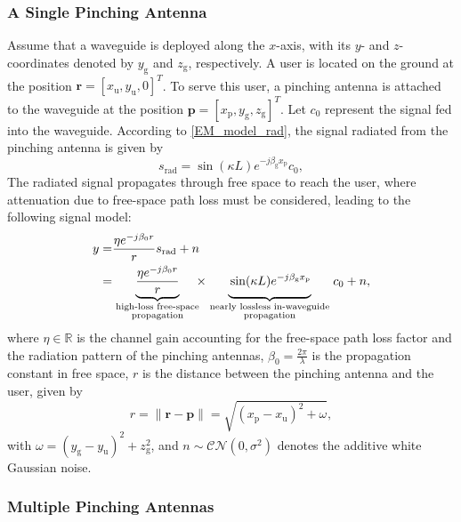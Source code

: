 \subsubsection{A Single Pinching Antenna}
Assume that a waveguide is deployed along the $x$-axis, with its $y$- and $z$-coordinates denoted by $y_{\mathrm{g}}$ and $z_{\mathrm{g}}$, respectively. A user is located on the ground at the position $\mathbf{r} = [x_{\mathrm{u}}, y_{\mathrm{u}}, 0]^T$. To serve this user, a pinching antenna is attached to the waveguide at the position $\mathbf{p} = [x_{\mathrm{p}}, y_{\mathrm{g}}, z_{\mathrm{g}}]^T$. Let $c_0$ represent the signal fed into the waveguide. According to \eqref{EM_model_rad}, the signal radiated from the pinching antenna is given by
\begin{equation}
s_{\mathrm{rad}} = \sin(\kappa L) e^{-j \beta_{\mathrm{g}} x_{\mathrm{p}}} c_0,
\end{equation}
The radiated signal propagates through free space to reach the user, where attenuation due to free-space path loss must be considered, leading to the following signal model:
\begin{align}
y = & \frac{\eta e^{-j \beta_0 r}}{r} s_{\mathrm{rad}} + n \nonumber \\
= & \underbrace{\frac{\eta e^{-j \beta_0 r}}{r}}_{\scriptstyle \text{high-loss free-space} \atop \scriptstyle \text{propagation}} \!\!\! \times \underbrace{ \vphantom{\frac{\eta e^{-j \beta_0 r}}{r}} \sin(\kappa L) e^{-j \beta_{\mathrm{g}} x_{\mathrm{p}}}}_{\scriptstyle \text{nearly lossless in-waveguide} \atop \scriptstyle  \text{propagation}}  c_0 + n,
\end{align}
where $\eta \in \mathbb{R}$ is the channel gain accounting for the free-space path loss factor and the radiation pattern of the pinching antennas, $\beta_0 = \frac{2 \pi}{\lambda}$ is the propagation constant in free space, $r$ is the distance between the pinching antenna and the user, given by
\begin{equation}
r = \| \mathbf{r} - \mathbf{p} \| = \sqrt{(x_{\mathrm{p}} - x_{\mathrm{u}})^2 + \omega},
\end{equation}
with $\omega = (y_{\mathrm{g}} - y_{\mathrm{u}})^2 + z_{\mathrm{g}}^2$, and $n \sim \mathcal{CN}(0 ,\sigma^2)$ denotes the additive white Gaussian noise. 


\subsubsection{Multiple Pinching Antennas}

